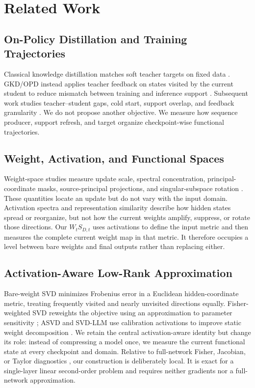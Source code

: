 \documentclass[letterpaper]{article} %
\begin{document}
\section{Related Work}

\subsection{On-Policy Distillation and Training Trajectories}

Classical knowledge distillation matches soft teacher targets on fixed data \citep{hinton2015distilling}. GKD/OPD instead applies teacher feedback on states visited by the current student to reduce mismatch between training and inference support \citep{agarwal2024opd}. Subsequent work studies teacher--student gaps, cold start, support overlap, and feedback granularity \citep{li2026rethinkingopd,song2026surveyopd,yang2026oprd}. We do not propose another objective. We measure how sequence producer, support refresh, and target organize checkpoint-wise functional trajectories.

\subsection{Weight, Activation, and Functional Spaces}

Weight-space studies measure update scale, spectral concentration, principal-coordinate masks, source-principal projections, and singular-subspace rotation \citep{zhu2025path,jin2025rlheals,yu2026dense}. These quantities locate an update but do not vary with the input domain. Activation spectra and representation similarity describe how hidden states spread or reorganize, but not how the current weights amplify, suppress, or rotate those directions. Our $W_tS_{D,t}$ uses activations to define the input metric and then measures the complete current weight map in that metric. It therefore occupies a level between bare weights and final outputs rather than replacing either.

\subsection{Activation-Aware Low-Rank Approximation}

Bare-weight SVD minimizes Frobenius error in a Euclidean hidden-coordinate metric, treating frequently visited and nearly unvisited directions equally. Fisher-weighted SVD reweights the objective using an approximation to parameter sensitivity \citep{hsu2022fisherweighted}; ASVD and SVD-LLM use calibration activations to improve static weight decomposition \citep{yuan2024asvd,wang2025svdllm}. We retain the central activation-aware identity but change its role: instead of compressing a model once, we measure the current functional state at every checkpoint and domain. Relative to full-network Fisher, Jacobian, or Taylor diagnostics \citep{amari1998natural,martens2015kfac,saadi2025flex}, our construction is deliberately local. It is exact for a single-layer linear second-order problem and requires neither gradients nor a full-network approximation.
\end{document}
